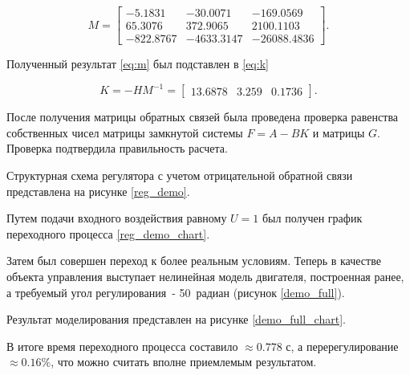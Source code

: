 \begin{equation}
  M=\begin{bmatrix}-5.1831&-30.0071&-169.0569\\65.3076&372.9065&2100.1103\\-822.8767&-4633.3147&-26088.4836\end{bmatrix}.
  \label{eq:m}
\end{equation}

Полученный результат \ref{eq:m} был подставлен в \ref{eq:k}

\begin{equation}
  K=-HM^{-1}=\begin{bmatrix}13.6878&3.259&0.1736\end{bmatrix}.
  \label{eq:k}
\end{equation}

После получения матрицы обратных связей была проведена проверка равенства
собственных чисел матрицы замкнутой системы $F = A - BK$ и матрицы $G$.
Проверка подтвердила правильность расчета.

Структурная схема регулятора с учетом отрицательной обратной связи представлена на рисунке \ref{reg_demo}.


Путем подачи входного воздействия равному $U=1$ был получен график переходного процесса \ref{reg_demo_chart}.


Затем был совершен переход к более реальным условиям. Теперь в качестве объекта управления
выступает нелинейная модель двигателя, построенная ранее, а требуемый угол 
регулирования~- 50~радиан (рисунок \ref{demo_full}).


Результат моделирования представлен на рисунке \ref{demo_full_chart}.

\clearpage


В итоге время переходного процесса составило $\approx0.778$ с, а перерегулирование $\approx0.16\%$,
что можно считать вполне приемлемым результатом.